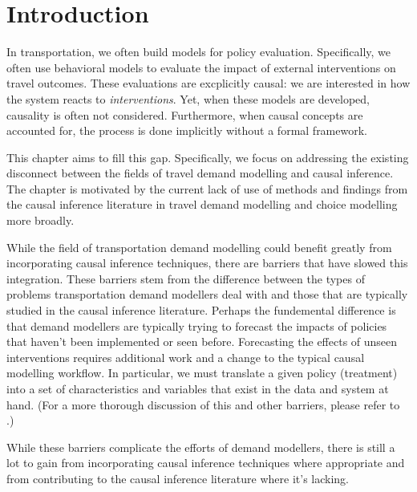 \section{Introduction}
\label{sec:intro}

In transportation, we often build models for policy evaluation.
Specifically, we often use behavioral models to evaluate the impact of external interventions on travel outcomes.
These evaluations are excplicitly causal: we are interested in how the
system reacts to \textit{interventions}.
Yet, when these models are
developed, causality is often not considered. Furthermore, when
causal concepts are accounted for, the process is done implicitly without a
formal framework.

This chapter aims to fill this gap.
Specifically, we focus on addressing the existing disconnect between the fields of travel demand modelling and causal inference.
The chapter is motivated by the current lack of use of methods and findings from
the causal inference literature in travel demand modelling and choice modelling more broadly.

While the field of transportation demand modelling could benefit greatly from
incorporating causal inference techniques, there are barriers that have slowed this integration.
These barriers stem from the difference between the types of problems transportation demand modellers deal with and those that are typically studied in the causal inference literature.
Perhaps the fundemental difference is that demand modellers are typically trying to forecast the impacts of policies that haven't been implemented or seen before.
Forecasting the effects of unseen interventions requires additional work and a change to the typical causal modelling workflow.
In particular, we must translate a given policy (treatment) into a set of characteristics and variables that exist in the data and system at hand.
(For a more thorough discussion of this and other barriers, please refer to \citet{brathwaite_2018_causal}.)

While these barriers complicate the efforts of demand modellers, there is still a lot to gain from
incorporating causal inference techniques where appropriate and from contributing
to the causal inference literature where it's lacking.

